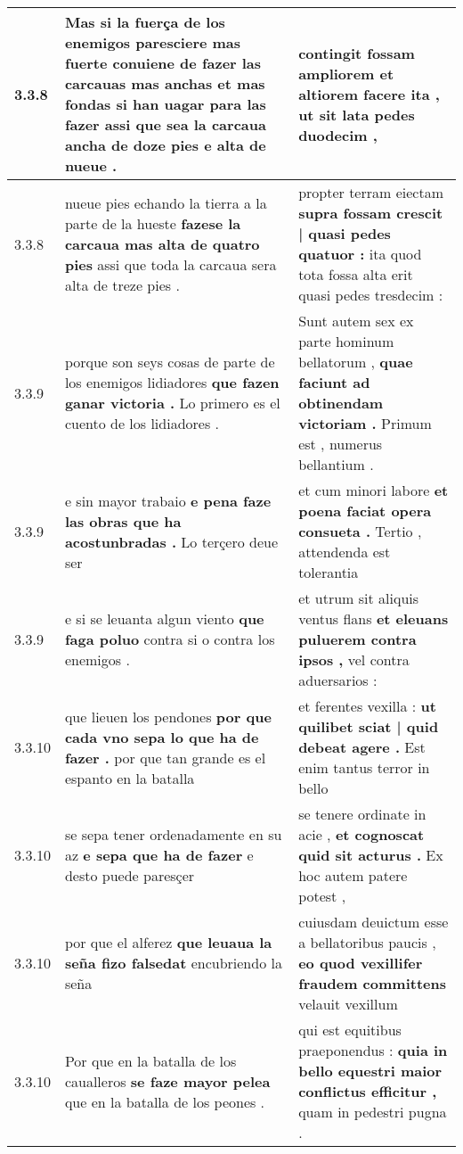 \begin{tabular}{|p{1cm}|p{6.5cm}|p{6.5cm}|}
3.3.8 & Mas si la fuerça de los enemigos paresciere mas fuerte conuiene de fazer las carcauas mas anchas et mas fondas \textbf{ si han uagar para las fazer } assi que sea la carcaua ancha de doze pies e alta de nueue . & contingit fossam ampliorem \textbf{ et altiorem facere ita , } ut sit lata pedes duodecim , \\\hline
3.3.8 & nueue pies echando la tierra a la parte de la hueste \textbf{ fazese la carcaua mas alta de quatro pies } assi que toda la carcaua sera alta de treze pies . & propter terram eiectam \textbf{ supra fossam crescit | quasi pedes quatuor : } ita quod tota fossa alta erit quasi pedes tresdecim : \\\hline
3.3.9 & porque son seys cosas de parte de los enemigos lidiadores \textbf{ que fazen ganar victoria . } Lo primero es el cuento de los lidiadores . & Sunt autem sex ex parte hominum bellatorum , \textbf{ quae faciunt ad obtinendam victoriam . } Primum est , numerus bellantium . \\\hline
3.3.9 & e sin mayor trabaio \textbf{ e pena faze las obras que ha acostunbradas . } Lo terçero deue ser & et cum minori labore \textbf{ et poena faciat opera consueta . } Tertio , attendenda est tolerantia \\\hline
3.3.9 & e si se leuanta algun viento \textbf{ que faga poluo } contra si o contra los enemigos . & et utrum sit aliquis ventus flans \textbf{ et eleuans puluerem contra ipsos , } vel contra aduersarios : \\\hline
3.3.10 & que lieuen los pendones \textbf{ por que cada vno sepa lo que ha de fazer . } por que tan grande es el espanto en la batalla & et ferentes vexilla : \textbf{ ut quilibet sciat | quid debeat agere . } Est enim tantus terror in bello \\\hline
3.3.10 & se sepa tener ordenadamente en su az \textbf{ e sepa que ha de fazer } e desto puede paresçer & se tenere ordinate in acie , \textbf{ et cognoscat quid sit acturus . } Ex hoc autem patere potest , \\\hline
3.3.10 & por que el alferez \textbf{ que leuaua la seña fizo falsedat } encubriendo la seña & cuiusdam deuictum esse a bellatoribus paucis , \textbf{ eo quod vexillifer fraudem committens } velauit vexillum \\\hline
3.3.10 & Por que en la batalla de los caualleros \textbf{ se faze mayor pelea } que en la batalla de los peones . & qui est equitibus praeponendus : \textbf{ quia in bello equestri maior conflictus efficitur , } quam in pedestri pugna . \\\hline

\end{tabular}
